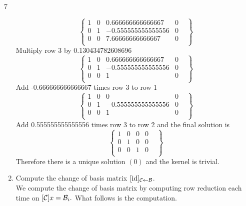 \documentclass{exercises}
\begin{document}
\begin{exr}{}{7}
\begin{enumerate}
\begin{equation}
\left\{
    \begin{array}{ccc|cl}1&0&0.666666666666667&0&\\0&1&-0.555555555555556&0&\\0&0&7.66666666666667&0&\\\end{array}
\right\}
\end{equation}Multiply row 3 by 0.130434782608696
\begin{equation}
\left\{
    \begin{array}{ccc|cl}1&0&0.666666666666667&0&\\0&1&-0.555555555555556&0&\\0&0&1&0&\\\end{array}
\right\}
\end{equation}Add -0.666666666666667 times row 3 to row 1
\begin{equation}
\left\{
    \begin{array}{ccc|cl}1&0&0&0&\\0&1&-0.555555555555556&0&\\0&0&1&0&\\\end{array}
\right\}
\end{equation}Add 0.555555555555556 times row 3 to row 2
and the final solution is
\begin{equation}
\left\{
    \begin{array}{ccc|cl}1&0&0&0&\\0&1&0&0&\\0&0&1&0&\\\end{array}
\right\}
\end{equation}
Therefore there is a unique solution $(0)$ and the kernel is trivial.

		\item Compute the change of basis matrix $[\id]_{\basis{C}\leftarrow \basis{B}}$. \\

		We compute the change of basis matrix by computing row reduction each time on $[\scriptc]x = \scriptb_i.$ What follows is the computation.


\end{enumerate}
\end{exr}
\end{document}
